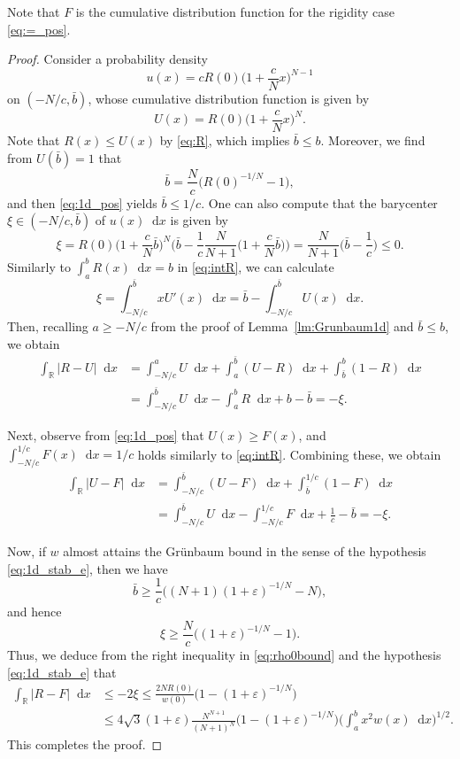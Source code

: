 \documentclass[sts]{imsart}
\theoremstyle{definition}
\theoremstyle{remark}
\newcommand{\R}{\mathbb{R}}
\newcommand*\diff{\mathop{}\!\mathrm{d}}
\begin{document}
Note that $F$ is the cumulative distribution function for the rigidity case \eqref{eq:=_pos}.

\begin{proof}
Consider a probability density
\[ u(x)=cR(0)\biggl( 1+\frac{c}{N}x\biggr)^{N-1} \]
on $(-N/c,\bar{b})$, whose cumulative distribution function is given by
\[ U(x) = R(0)\biggl( 1+\frac{c}{N}x \biggr)^{N}. \]
Note that $R(x) \le U(x)$ by \eqref{eq:R}, which implies $\bar{b} \le b$.
Moreover, we find from $U(\bar{b})=1$ that
\[ \bar{b}=\frac{N}{c} \bigl(R(0)^{-1/N}-1 \bigr), \]
and then \eqref{eq:1d_pos} yields $\bar{b}\leq 1/c$.
One can also compute that the barycenter $\xi \in (-N/c,\bar{b})$ of $u(x) \diff x$ is given by
\[
\xi = R(0) \biggl( 1+\frac{c}{N}\bar{b} \biggr)^N
\biggl( \bar{b}-\frac{1}{c}\frac{N}{N+1} \biggl(1+\frac{c}{N}\bar{b}\biggr) \biggr)
 = \frac{N}{N+1} \biggl( \bar{b}-\frac{1}{c} \biggr)
 \le 0.
\]
Similarly to $\int_a^b R(x) \diff x=b$ in \eqref{eq:intR}, we can calculate
\[
\xi =\int_{-N/c}^{\bar{b}} xU'(x) \diff x
=\bar{b} -\int_{-N/c}^{\bar{b}} U(x) \diff x.
\]
Then, recalling $a \ge -N/c$ from the proof of Lemma~\ref{lm:Grunbaum1d} and $\bar{b} \le b$,
we obtain
\begin{align*}
    \int_\R |R-U| \diff x
    &= \int_{-N/c}^a U \diff x + \int_a^{\bar{b}} (U-R) \diff x + \int_{\bar{b}}^b (1-R) \diff x\\
    &= \int_{-N/c}^{\bar{b}} U \diff x -\int_a^b R \diff x +b-\bar{b}
     = -\xi.
\end{align*}

Next, observe from \eqref{eq:1d_pos} that $U(x) \ge F(x)$, and $\int_{-N/c}^{1/c} F(x) \diff x =1/c$ holds similarly to \eqref{eq:intR}.
Combining these, we obtain
\begin{align*}
   \int_\R |U-F| \diff x
   &= \int_{-N/c}^{\bar{b}} (U-F) \diff x + \int_{\bar{b}}^{1/c} (1-F) \diff x\\
   &= \int_{-N/c}^{\bar{b}} U \diff x - \int_{-N/c}^{1/c} F \diff x + \frac{1}{c}-\bar{b}
   = -\xi.
\end{align*}

Now, if $w$ almost attains the Gr\"unbaum bound in the sense of the hypothesis \eqref{eq:1d_stab_e}, then we have
\[
\bar{b} \geq \frac{1}{c} \bigl((N+1)(1+\varepsilon)^{-1/N}-N\bigr),
\]
and hence
\[
\xi \geq \frac{N}{c} \bigl( (1+\varepsilon)^{-1/N}-1 \bigr).
\]
Thus, we deduce from the right inequality in \eqref{eq:rho0bound} and the hypothesis \eqref{eq:1d_stab_e}
that
\begin{align*}
\int_\R |R-F| \diff x
&\le -2\xi
 \le \frac{2NR(0)}{w(0)} \bigl(1-(1+\varepsilon)^{-1/N} \bigr) \\
&\le 4\sqrt{3} (1+\varepsilon) \frac{N^{N+1}}{(N+1)^N} \bigl(1-(1+\varepsilon)^{-1/N} \bigr)
\biggl( \int_a^b x^2 w(x) \diff x \biggr)^{1/2}.
\end{align*}
This completes the proof.
\end{proof}
\end{document}
